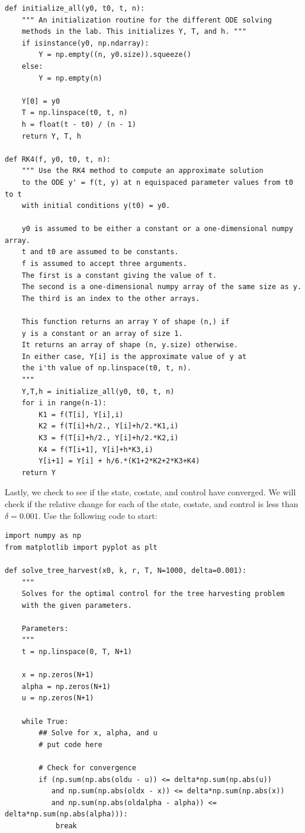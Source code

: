 \begin{lstlisting}
def initialize_all(y0, t0, t, n):
    """ An initialization routine for the different ODE solving
    methods in the lab. This initializes Y, T, and h. """
    if isinstance(y0, np.ndarray):
        Y = np.empty((n, y0.size)).squeeze()
    else:
        Y = np.empty(n)

    Y[0] = y0
    T = np.linspace(t0, t, n)
    h = float(t - t0) / (n - 1)
    return Y, T, h

def RK4(f, y0, t0, t, n):
    """ Use the RK4 method to compute an approximate solution
    to the ODE y' = f(t, y) at n equispaced parameter values from t0 to t
    with initial conditions y(t0) = y0.

    y0 is assumed to be either a constant or a one-dimensional numpy array.
    t and t0 are assumed to be constants.
    f is assumed to accept three arguments.
    The first is a constant giving the value of t.
    The second is a one-dimensional numpy array of the same size as y.
    The third is an index to the other arrays.

    This function returns an array Y of shape (n,) if
    y is a constant or an array of size 1.
    It returns an array of shape (n, y.size) otherwise.
    In either case, Y[i] is the approximate value of y at
    the i'th value of np.linspace(t0, t, n).
    """
    Y,T,h = initialize_all(y0, t0, t, n)
    for i in range(n-1):
        K1 = f(T[i], Y[i],i)
        K2 = f(T[i]+h/2., Y[i]+h/2.*K1,i)
        K3 = f(T[i]+h/2., Y[i]+h/2.*K2,i)
        K4 = f(T[i+1], Y[i]+h*K3,i)
        Y[i+1] = Y[i] + h/6.*(K1+2*K2+2*K3+K4)
    return Y

\end{lstlisting}


Lastly, we check to see if the state, costate, and control have converged.
We will check if the relative change for each of the state, costate, and control is less than \(\delta = 0.001\).
Use the following code to start:

\begin{lstlisting}
import numpy as np
from matplotlib import pyplot as plt

def solve_tree_harvest(x0, k, r, T, N=1000, delta=0.001):
    """
    Solves for the optimal control for the tree harvesting problem
    with the given parameters.

    Parameters:
    """
    t = np.linspace(0, T, N+1)

    x = np.zeros(N+1)
    alpha = np.zeros(N+1)
    u = np.zeros(N+1)

    while True:
        ## Solve for x, alpha, and u
        # put code here

        # Check for convergence
        if (np.sum(np.abs(oldu - u)) <= delta*np.sum(np.abs(u))
           and np.sum(np.abs(oldx - x)) <= delta*np.sum(np.abs(x))
           and np.sum(np.abs(oldalpha - alpha)) <= delta*np.sum(np.abs(alpha))):
            break

\end{lstlisting}

